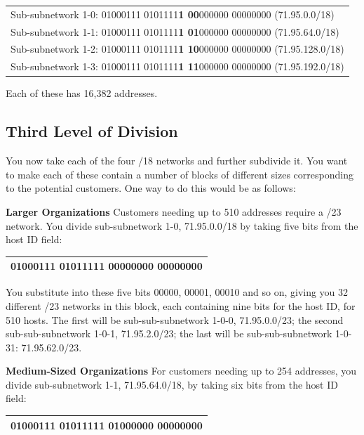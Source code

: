 \documentclass[b5paper,11pt]{memoir}
\begin{document}
\begin{longtable}[]{@{}l@{}}
\toprule
\endhead
Sub-subnetwork 1-0: 01000111 0101111{\textbf{1 {00}}}000000 00000000
(71.95.0.0/18)\tabularnewline
Sub-subnetwork 1-1: 01000111 0101111{\textbf{1 {01}}}000000 00000000
(71.95.64.0/18)\tabularnewline
Sub-subnetwork 1-2: 01000111 0101111{\textbf{1 {10}}}000000 00000000
(71.95.128.0/18)\tabularnewline
Sub-subnetwork 1-3: 01000111 0101111{\textbf{1 {11}}}000000 00000000
(71.95.192.0/18)\tabularnewline
\bottomrule
\end{longtable}

Each of these has 16,382 addresses.

\subsection[Third Level of
Division]{\texorpdfstring{\protect\hypertarget{ch20s04.htmlux5cux23third_level_of_division}{}{}Third
Level of Division}{Third Level of Division}}

You now take each of the four /18 networks and further subdivide it. You
want to make each of these contain a number of blocks of different sizes
corresponding to the potential customers. One way to do this would be as
follows:

{\textbf{Larger Organizations}} Customers needing up to 510 addresses
require a /23 network. You divide sub-subnetwork 1-0, 71.95.0.0/18 by
taking five bits from the host ID field:

\begin{longtable}[]{@{}l@{}}
\toprule
\endhead
01000111 0101111{\textbf{1 {00}}}{{00000}}0 00000000\tabularnewline
\bottomrule
\end{longtable}

You substitute into these five bits 00000, 00001, 00010 and so on,
giving you 32 different /23 networks in this block, each containing nine
bits for the host ID, for 510 hosts. The first will be
sub-sub-subnetwork 1-0-0, 71.95.0.0/23; the second sub-sub-subnetwork
1-0-1, 71.95.2.0/23; the last will be sub-sub-subnetwork 1-0-31:
71.95.62.0/23.

{\textbf{Medium-Sized Organizations}} For customers needing up to 254
addresses, you divide sub-subnetwork 1-1, 71.95.64.0/18, by taking six
bits from the host ID field:

\begin{longtable}[]{@{}l@{}}
\toprule
\endhead
01000111 0101111{\textbf{1 {01}}}{{000000}} 00000000\tabularnewline
\bottomrule
\end{longtable}
\end{document}
